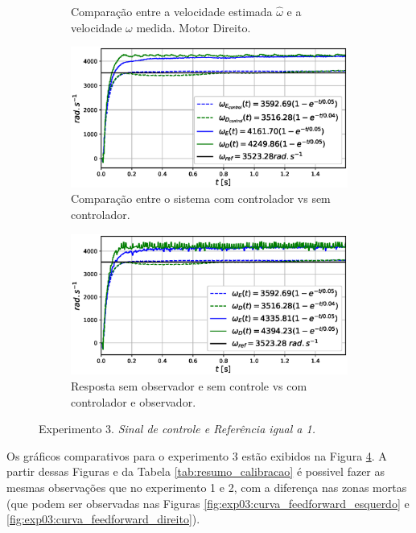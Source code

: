 \begin{figure}[H]
\begin{subfigure}{.5\textwidth}
    \caption{Comparação entre a velocidade estimada $\hat{\omega}$ e a velocidade $\omega$ medida. Motor Direito.}
    \label{fig:exp03:filtragem_direito}
    \end{subfigure}
    \hfill
    \begin{subfigure}{.5\textwidth}
    \centering
    \includegraphics[width=\textwidth]{figuras/resultados/exp03/controlador_vs_sem_controlador100.eps}
    \caption{Comparação entre o sistema com controlador vs sem controlador.}
    \label{fig:exp03:controle}
    \end{subfigure}
    \hfill
    \begin{subfigure}{.5\textwidth}
    \centering
    \includegraphics[width=\textwidth]{figuras/resultados/exp03/antes_vs_depois100.eps}
    \caption{Resposta sem observador e sem controle vs com controlador e observador.}
    \label{fig:exp03:antes_vs_depois}
    \end{subfigure}
    
    \caption{Experimento 3. \emph{Sinal de controle e Referência igual a 1.}}
    \label{fig:exp03_100}
\end{figure}

Os gráficos comparativos para o experimento 3 estão exibidos na Figura \ref{fig:exp03_100}. A partir dessas Figuras e da Tabela \ref{tab:resumo_calibracao} é possivel fazer as mesmas observações que no experimento 1 e 2, com a diferença nas zonas mortas (que podem ser observadas nas Figuras \ref{fig:exp03:curva_feedforward_esquerdo} e \ref{fig:exp03:curva_feedforward_direito}).


